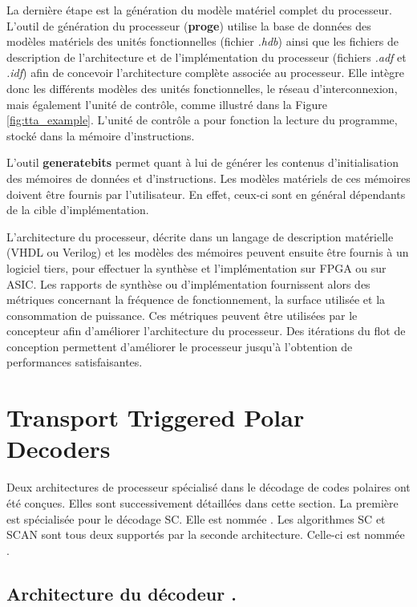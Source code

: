 La dernière étape est la génération du modèle matériel complet du processeur. L'outil de génération du processeur (\textbf{proge}) utilise la base de données des modèles matériels des unités fonctionnelles (fichier \textit{.hdb}) ainsi que les fichiers de description de l'architecture et de l'implémentation du processeur (fichiers \textit{.adf} et \textit{.idf}) afin de concevoir l'architecture complète associée au processeur. Elle intègre donc les différents modèles des unités fonctionnelles, le réseau d'interconnexion, mais également l'unité de contrôle, comme illustré dans la Figure \ref{fig:tta_example}. L'unité de contrôle a pour fonction la lecture du programme, stocké dans la mémoire d'instructions.

L'outil \textbf{generatebits} permet quant à lui de générer les contenus d'initialisation des mémoires de données et d'instructions. Les modèles matériels de ces mémoires doivent être fournis par l'utilisateur. En effet, ceux-ci sont en général dépendants de la cible d'implémentation.

L'architecture du processeur, décrite dans un langage de description matérielle (VHDL ou Verilog) et les modèles des mémoires peuvent ensuite être fournis à un logiciel tiers, pour effectuer la synthèse et l'implémentation sur FPGA ou sur ASIC. Les rapports de synthèse ou d'implémentation fournissent alors des métriques concernant la fréquence de fonctionnement, la surface utilisée et la consommation de puissance. Ces métriques peuvent être utilisées par le concepteur afin d'améliorer l'architecture du processeur. Des itérations du flot de conception permettent d'améliorer le processeur jusqu'à l'obtention de performances satisfaisantes.



\section{Transport Triggered Polar Decoders}
\label{sec:tta_design}

Deux architectures de processeur spécialisé dans le décodage de codes polaires ont été conçues. Elles sont successivement détaillées dans cette section. La première est spécialisée pour le décodage SC. Elle est nommée \TTSC. Les algorithmes SC et SCAN sont tous deux supportés par la seconde architecture. Celle-ci est nommée \TTSCAN.

\subsection{Architecture du décodeur \TTSC.}

